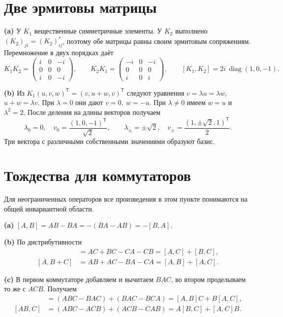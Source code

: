 \documentclass[11pt,a4paper]{article}
\begin{document}

\section{Две эрмитовы матрицы}

\textbf{(a)} У \(K_1\) вещественные симметричные элементы. У \(K_2\)
выполнено \((K_2)_{ji}=(K_2)_{ij}^*\), поэтому обе матрицы равны своим
эрмитовым сопряжениям. Перемножение в двух порядках даёт
\[
 K_1K_2=\begin{pmatrix}i&0&-i\\0&0&0\\i&0&-i\end{pmatrix},
 \qquad K_2K_1=\begin{pmatrix}-i&0&-i\\0&0&0\\i&0&i\end{pmatrix},
 \qquad [K_1,K_2]=2i\,\operatorname{diag}(1,0,-1).
\]

\textbf{(b)} Из \(K_1(u,v,w)^{\mathsf T}=(v,u+w,v)^{\mathsf T}\) следуют
уравнения \(v=\lambda u=\lambda w\), \(u+w=\lambda v\).
При \(\lambda=0\) они дают \(v=0,\ w=-u\). При \(\lambda\ne0\)
имеем \(w=u\) и \(\lambda^2=2\). После деления на длины векторов получаем
\[
 \lambda_0=0,\quad v_0=\frac{(1,0,-1)^{\mathsf T}}{\sqrt2},
 \qquad \lambda_\pm=\pm\sqrt2,\quad
 v_\pm=\frac{(1,\pm\sqrt2,1)^{\mathsf T}}{2}.
\]
Три вектора с различными собственными значениями образуют базис.

\section{Тождества для коммутаторов}

Для неограниченных операторов все произведения в этом пункте
понимаются на общей инвариантной области.

\textbf{(a)} \( [A,B]=AB-BA=-(BA-AB)=-[B,A]\).

\textbf{(b)} По дистрибутивности
\begin{align*}
 [A+B,C]&=AC+BC-CA-CB=[A,C]+[B,C],\\
 [A,B+C]&=AB+AC-BA-CA=[A,B]+[A,C].
\end{align*}

\textbf{(c)} В первом коммутаторе добавляем и вычитаем \(BAC\),
во втором проделываем то же с \(ACB\). Получаем
\begin{align*}
 [A,BC]&=(ABC-BAC)+(BAC-BCA)=[A,B]C+B[A,C],\\
 [AB,C]&=(ABC-ACB)+(ACB-CAB)=A[B,C]+[A,C]B.
\end{align*}
\end{document}
